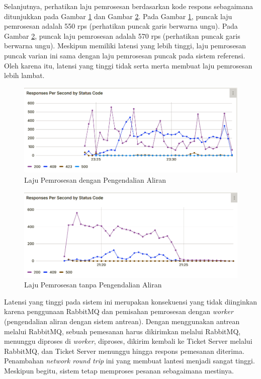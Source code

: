 Selanjutnya, perhatikan laju pemrosesan berdasarkan kode respons sebagaimana ditunjukkan pada Gambar \ref{fig:rps-fc-pg-stress-0} dan Gambar \ref{fig:rps-nofc-pg-stress-0}. Pada Gambar \ref{fig:rps-fc-pg-stress-0}, puncak laju pemrosesan adalah 550 rps (perhatikan puncak garis berwarna ungu). Pada Gambar \ref{fig:rps-nofc-pg-stress-0}, puncak laju pemrosesan adalah 570 rps (perhatikan puncak garis berwarna ungu). Meskipun memiliki latensi yang lebih tinggi, laju pemrosesan puncak varian ini sama dengan laju pemrosesan puncak pada sistem referensi. Oleh karena itu, latensi yang tinggi tidak serta merta membuat laju pemrosesan lebih lambat.

\begin{figure}[H]
    \centering
    \includegraphics[width=1\textwidth]{resources/chapter-4/rps-fc-pg-stress-0.png}
    \caption{Laju Pemrosesan dengan Pengendalian Aliran}
    \label{fig:rps-fc-pg-stress-0}
\end{figure}

\begin{figure}[H]
    \centering
    \includegraphics[width=1\textwidth]{resources/chapter-4/rps-nofc-pg-stress-0.png}
    \caption{Laju Pemrosesan tanpa Pengendalian Aliran}
    \label{fig:rps-nofc-pg-stress-0}
\end{figure}

Latensi yang tinggi pada sistem ini merupakan konsekuensi yang tidak diinginkan karena penggunaan RabbitMQ dan pemisahan pemrosesan dengan \textit{worker} (pengendalian aliran dengan sistem antrean). Dengan menggunakan antrean melalui RabbitMQ, sebuah pemesanan harus dikirimkan melalui RabbitMQ, menunggu diproses di \textit{worker}, diproses, dikirim kembali ke Ticket Server melalui RabbitMQ, dan Ticket Server menunggu hingga respons pemesanan diterima. Penambahan \textit{network round trip} ini yang membuat lantesi menjadi sangat tinggi. Meskipun begitu, sistem tetap memproses pesanan sebagaimana mestinya.

